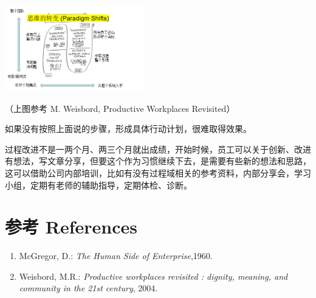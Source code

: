 
\includegraphics[width=6cm]{微信截图_20231025084623.png}

（上图参考 M. Weisbord, Productive Workplaces Revisited）

如果没有按照上面说的步骤，形成具体行动计划，很难取得效果。

过程改进不是一两个月、两三个月就出成绩，开始时候，员工可以关于创新、改进有想法，写文章分享，但要这个作为习惯继续下去，是需要有些新的想法和思路，这可以借助公司内部培训，比如有没有过程域相关的参考资料，内部分享会，学习小组，定期有老师的辅助指导，定期体检、诊断。


\hypertarget{ux9644ux4ef6}{%
\section{参考 References}\label{ux9644ux4ef6}}

\begin{enumerate}
\tightlist
\item
  McGregor, D.: \emph{The Human Side of Enterprise},1960.\\
\item
  Weisbord, M.R.: \emph{Productive workplaces revisited : dignity,
  meaning, and community in the 21st century}, 2004.
\end{enumerate}



